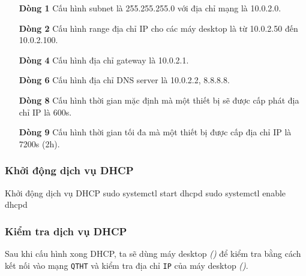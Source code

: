 \begin{itemize}
  \item [\textbf{Dòng 1}] Cấu hình subnet là 255.255.255.0 với địa chỉ mạng là 10.0.2.0.
  \item [\textbf{Dòng 2}] Cấu hình range địa chỉ IP cho các máy desktop là từ 10.0.2.50 đến 10.0.2.100.
  \item [\textbf{Dòng 4}] Cấu hình địa chỉ gateway là 10.0.2.1.
  \item [\textbf{Dòng 6}] Cấu hình địa chỉ DNS server là 10.0.2.2, 8.8.8.8.
  \item [\textbf{Dòng 8}] Cấu hình thời gian mặc định mà một thiết bị sẽ được cấp phát địa chỉ IP là 600s.
  \item [\textbf{Dòng 9}] Cấu hình thời gian tối đa mà một thiết bị được cấp địa chỉ IP là 7200s (2h).
\end{itemize}

\subsubsection{Khởi động dịch vụ DHCP}


\vspace{0.5cm}
\begin{coding}{Khởi động dịch vụ DHCP}
  sudo systemctl start dhcpd
  sudo systemctl enable dhcpd
\end{coding}

\subsubsection{Kiểm tra dịch vụ DHCP}

Sau khi cấu hình xong DHCP, ta sẽ dùng máy desktop \textit{()} để kiểm tra bằng cách kết nối vào mạng \texttt{QTHT} và kiểm tra địa chỉ \texttt{IP}
của máy desktop \textit{()}.


